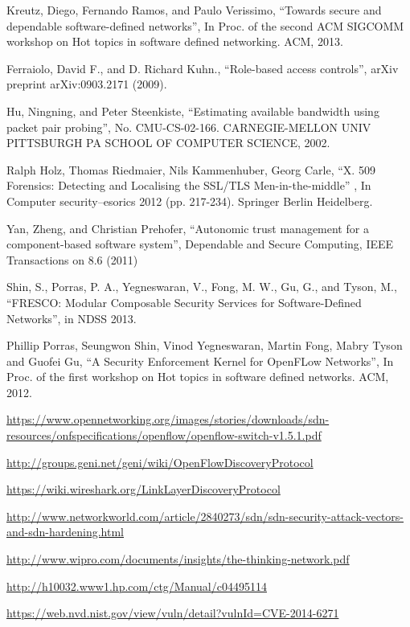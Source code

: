 \begin{thebibliography}{1}
Kreutz, Diego, Fernando Ramos, and Paulo Verissimo, 
``Towards secure and dependable software-defined networks'', In Proc. of the second ACM SIGCOMM workshop on Hot topics in software defined networking. ACM, 2013.


Ferraiolo, David F., and D. Richard Kuhn., 
``Role-based access controls'', arXiv preprint arXiv:0903.2171 (2009).

\bibitem{}
Hu, Ningning, and Peter Steenkiste,
``Estimating available bandwidth using packet pair probing'', No. CMU-CS-02-166. CARNEGIE-MELLON UNIV PITTSBURGH PA SCHOOL OF COMPUTER SCIENCE, 2002.

Ralph Holz, Thomas Riedmaier, Nils Kammenhuber, Georg Carle, 
``X. 509 Forensics: Detecting and Localising the SSL/TLS Men-in-the-middle'' , In Computer security–esorics 2012 (pp. 217-234). Springer Berlin Heidelberg.

Yan, Zheng, and Christian Prehofer,
``Autonomic trust management for a component-based software system'', Dependable and Secure Computing, IEEE Transactions on 8.6 (2011)

Shin, S., Porras, P. A., Yegneswaran, V., Fong, M. W., Gu, G., and Tyson, M.,
``FRESCO: Modular Composable Security Services for Software-Defined Networks'', in NDSS 2013.

Phillip Porras, Seungwon Shin, Vinod Yegneswaran, Martin Fong, Mabry Tyson and Guofei Gu,
``A Security Enforcement Kernel for OpenFLow Networks'', In Proc. of the first workshop on Hot topics in software defined networks. ACM, 2012.

\url{https://www.opennetworking.org/images/stories/downloads/sdn-resources/onfspecifications/openflow/openflow-switch-v1.5.1.pdf}

\url{http://groups.geni.net/geni/wiki/OpenFlowDiscoveryProtocol}

\url{https://wiki.wireshark.org/LinkLayerDiscoveryProtocol}

\url{http://www.networkworld.com/article/2840273/sdn/sdn-security-attack-vectors-and-sdn-hardening.html}

\url{http://www.wipro.com/documents/insights/the-thinking-network.pdf}

\url{http://h10032.www1.hp.com/ctg/Manual/c04495114}

\url{https://web.nvd.nist.gov/view/vuln/detail?vulnId=CVE-2014-6271}


\end{thebibliography}
